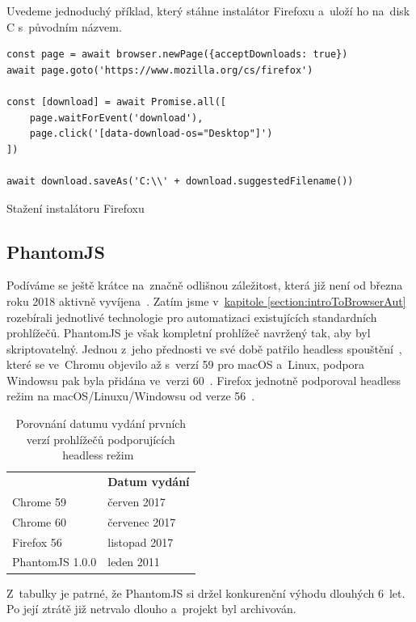 \documentclass[12pt, a4paper, twoside]{article}
\newcommand{\codefigureSpacing}{1.2}
\newcommand{\refAddedText}[3]{\hyperref[#1]{#2\ref{#1}#3}}
\begin{document}
	Uvedeme jednoduchý příklad, který stáhne instalátor Firefoxu a~uloží ho na~disk C s~původním názvem.
	\begin{codefigure}[H]
	\renewcommand\baselinestretch{\codefigureSpacing}
	\begin{lstlisting}[style=MyJavaScript]
const page = await browser.newPage({acceptDownloads: true})
await page.goto('https://www.mozilla.org/cs/firefox')

const [download] = await Promise.all([
	page.waitForEvent('download'),
	page.click('[data-download-os="Desktop"]')
])

await download.saveAs('C:\\' + download.suggestedFilename())
	\end{lstlisting}
	\caption{Stažení instalátoru Firefoxu}
\end{codefigure}
	\newpage
	\subsection{PhantomJS}
	Podíváme se ještě krátce na~značně odlišnou záležitost, která již není od března roku 2018 aktivně vyvíjena~\cite{phantomJsArchiving}. Zatím jsme v~\refAddedText{section:introToBrowserAut}{kapitole }{} rozebírali jednotlivé technologie pro automatizaci existujících standardních prohlížečů. PhantomJS je však kompletní prohlížeč navržený tak, aby byl skriptovatelný. Jednou z~jeho přednosti ve své době patřilo headless spouštění~\cite{phantomJsMainPage}, které se ve~Chromu objevilo až s~verzí 59 pro macOS a~Linux, podpora Windowsu pak byla přidána ve~verzi 60~\cite{headlessChromeGettingStarted}. Firefox jednotně podporoval headless režim na macOS/Linuxu/Windowsu od verze 56~\cite{headlessFirefox}.
	
	\begin{table}[H]
		\centering
		\begin{tabular}{ l|l } 
			\rowcolor{tableHeadingBackground}
			\multicolumn{1}{l}{\textbf{Prohlížeče}} & \multicolumn{1}{l}{\textbf{Datum vydání}} \\
			Chrome 59 & červen 2017 \\ 
			Chrome 60 & červenec 2017 \\
			Firefox 56 & listopad 2017 \\
			PhantomJS 1.0.0 & leden 2011
		\end{tabular}
		\captionsetup{justification=centering}
		\caption{Porovnání datumu vydání prvních verzí prohlížečů podporujících \mbox{head\-less} režim~\cite{googleChromeReleases, firefoxReleaseCalendar, phantomJsFirstRelease}}
	\end{table}
	Z~tabulky je patrné, že PhantomJS si držel konkurenční výhodu dlouhých 6~let. Po její ztrátě již netrvalo dlouho a~projekt byl archivován.
	
\end{document}
